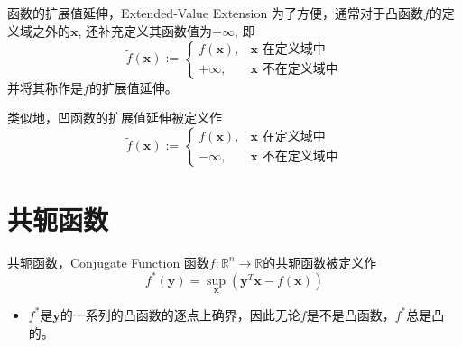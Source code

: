 \begin{frame}

\begin{block}{函数的扩展值延伸，Extended-Value Extension}
为了方便，通常对于凸函数$f$的定义域之外的$\mathbf{x}$, 还补充定义其函数值为$+\infty$, 即
\[\widetilde{f}(\mathbf{x}) := \begin{cases}
f(\mathbf{x}), & \mathbf{x} \text{ 在定义域中} \\
+\infty, & \mathbf{x} \text{ 不在定义域中}
\end{cases}\]
并将其称作是$f$的扩展值延伸。

\vspace{1em}

类似地，凹函数的扩展值延伸被定义作
\[\widetilde{f}(\mathbf{x}) := \begin{cases}
f(\mathbf{x}), & \mathbf{x} \text{ 在定义域中} \\
-\infty, & \mathbf{x} \text{ 不在定义域中}
\end{cases}\]
\end{block}

\end{frame}


\section{共轭函数}


\begin{frame}

\begin{block}{共轭函数，Conjugate Function}
函数$f: \mathbb{R}^n \to \mathbb{R}$的共轭函数被定义作
\[f^*(\mathbf{y}) = \sup\limits_{\mathbf{x}} \left( \mathbf{y}^T\mathbf{x} - f(\mathbf{x}) \right)\]

\begin{itemize}
\item $f^*$是$\mathbf{y}$的一系列的凸函数的逐点上确界，因此无论$f$是不是凸函数，$f^*$总是凸的。
\end{itemize}
\end{block}

\end{frame}


